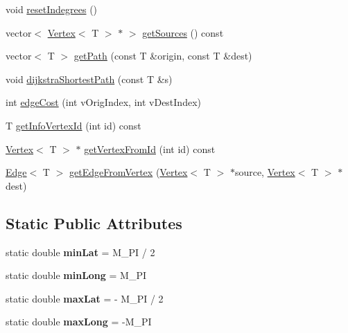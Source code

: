 \begin{DoxyCompactItemize}
\item 
void \hyperlink{class_graph_af34eb86d804272e6e3e221a9ed688c53}{reset\+Indegrees} ()
\item 
vector$<$ \hyperlink{class_vertex}{Vertex}$<$ T $>$ $\ast$ $>$ \hyperlink{class_graph_a947115150a94f88ac9aedbcec59dd07e}{get\+Sources} () const
\item 
vector$<$ T $>$ \hyperlink{class_graph_ab4054ca572c10669dd3e05d6d41c116c}{get\+Path} (const T \&origin, const T \&dest)
\item 
void \hyperlink{class_graph_a445a38cf4045797198eae2b818b602de}{dijkstra\+Shortest\+Path} (const T \&s)
\item 
int \hyperlink{class_graph_a7e137f1ef838395ac1044a944fa54448}{edge\+Cost} (int v\+Orig\+Index, int v\+Dest\+Index)
\item 
T \hyperlink{class_graph_a4381ffcd7b26938461c08561fa8bec6c}{get\+Info\+Vertex\+Id} (int id) const
\item 
\hyperlink{class_vertex}{Vertex}$<$ T $>$ $\ast$ \hyperlink{class_graph_ae4591fdf391d3a06a77a3394b7336cfa}{get\+Vertex\+From\+Id} (int id) const
\item 
\hyperlink{class_edge}{Edge}$<$ T $>$ \hyperlink{class_graph_a05fe0254b4f8ac9d3af0fb47561212d8}{get\+Edge\+From\+Vertex} (\hyperlink{class_vertex}{Vertex}$<$ T $>$ $\ast$source, \hyperlink{class_vertex}{Vertex}$<$ T $>$ $\ast$dest)
\end{DoxyCompactItemize}
\subsection*{Static Public Attributes}
\begin{DoxyCompactItemize}
\item 
\mbox{\label{class_graph_a20cee280046c04973100579dad94df0a}} 
static double {\bfseries min\+Lat} = M\+\_\+\+PI / 2
\item 
\mbox{\label{class_graph_a9033117ba69c8a705981543e33ad2bd1}} 
static double {\bfseries min\+Long} = M\+\_\+\+PI
\item 
\mbox{\label{class_graph_aee83a4a3968c681cc6d5ef1ccb4c58e0}} 
static double {\bfseries max\+Lat} = -\/ M\+\_\+\+PI / 2
\item 
\mbox{\label{class_graph_aa06562c2cf1457406deb48f63e890ecf}} 
static double {\bfseries max\+Long} = -\/M\+\_\+\+PI
\end{DoxyCompactItemize}


